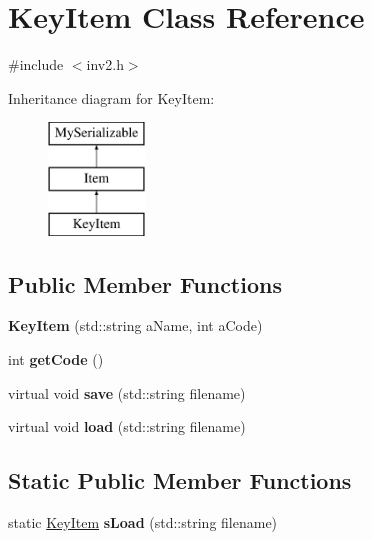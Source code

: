 \hypertarget{class_key_item}{}\section{Key\+Item Class Reference}
\label{class_key_item}


{\ttfamily \#include $<$inv2.\+h$>$}

Inheritance diagram for Key\+Item\+:\begin{figure}[H]
\begin{center}
\leavevmode
\includegraphics[height=3.000000cm]{class_key_item}
\end{center}
\end{figure}
\subsection*{Public Member Functions}
\begin{DoxyCompactItemize}
\item 
\hypertarget{class_key_item_aa0baded1e424eb98bfd44a02b69cc09a}{}\label{class_key_item_aa0baded1e424eb98bfd44a02b69cc09a} 
{\bfseries Key\+Item} (std\+::string a\+Name, int a\+Code)
\item 
\hypertarget{class_key_item_a3b9afd2ff4fc063a2821fa8fe4427fce}{}\label{class_key_item_a3b9afd2ff4fc063a2821fa8fe4427fce} 
int {\bfseries get\+Code} ()
\item 
\hypertarget{class_key_item_a9cf93545aaadfe60b3ca76c557acc38a}{}\label{class_key_item_a9cf93545aaadfe60b3ca76c557acc38a} 
virtual void {\bfseries save} (std\+::string filename)
\item 
\hypertarget{class_key_item_ae589a39407c4fd6ff1a9086693665532}{}\label{class_key_item_ae589a39407c4fd6ff1a9086693665532} 
virtual void {\bfseries load} (std\+::string filename)
\end{DoxyCompactItemize}
\subsection*{Static Public Member Functions}
\begin{DoxyCompactItemize}
\item 
\hypertarget{class_key_item_a853eded6ba25adb28a34020285ee0e7e}{}\label{class_key_item_a853eded6ba25adb28a34020285ee0e7e} 
static \hyperlink{class_key_item}{Key\+Item} {\bfseries s\+Load} (std\+::string filename)
\end{DoxyCompactItemize}
